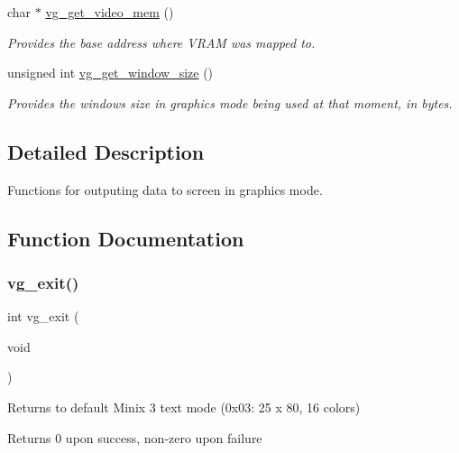 \begin{DoxyCompactItemize}
char $\ast$ \hyperlink{group__video__gr_ga0cd2b85b0088ab47b2b7bb6c135ad4b1}{vg\+\_\+get\+\_\+video\+\_\+mem} ()
\begin{DoxyCompactList}\small\item\em Provides the base address where V\+R\+AM was mapped to. \end{DoxyCompactList}\item 
unsigned int \hyperlink{group__video__gr_ga4151e15542f022beebb852786a5c19ef}{vg\+\_\+get\+\_\+window\+\_\+size} ()
\begin{DoxyCompactList}\small\item\em Provides the window\textquotesingle{}s size in graphics mode being used at that moment, in bytes. \end{DoxyCompactList}\end{DoxyCompactItemize}


\subsection{Detailed Description}
Functions for outputing data to screen in graphics mode. 



\subsection{Function Documentation}
\hypertarget{group__video__gr_ga42f593e6656f1a978315aff02b1bcebf}{}\label{group__video__gr_ga42f593e6656f1a978315aff02b1bcebf} 
\subsubsection{\texorpdfstring{vg\+\_\+exit()}{vg\_exit()}}
{\footnotesize\ttfamily int vg\+\_\+exit (\begin{DoxyParamCaption}\item[{void}]{ }\end{DoxyParamCaption})}



Returns to default Minix 3 text mode (0x03\+: 25 x 80, 16 colors) 

\begin{DoxyReturn}{Returns}
0 upon success, non-\/zero upon failure 
\end{DoxyReturn}
\hypertarget{group__video__gr_gafd3e5d6a8df0f0b3c5a23fc10f715348}{}\label{group__video__gr_gafd3e5d6a8df0f0b3c5a23fc10f715348} 
